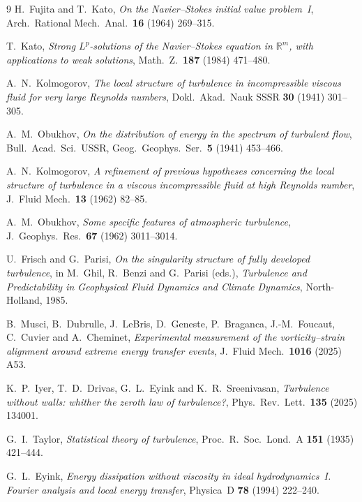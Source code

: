 \documentclass[11pt]{article}
\begin{document}
\begin{thebibliography}{9}
 H.~Fujita and T.~Kato, \emph{On the Navier--Stokes initial value problem~I},
Arch.\ Rational Mech.\ Anal.\ \textbf{16} (1964) 269--315.

 T.~Kato, \emph{Strong $L^p$-solutions of the Navier--Stokes equation in
$\mathbb{R}^m$, with applications to weak solutions}, Math.\ Z.\ \textbf{187} (1984) 471--480.

 A.~N.~Kolmogorov, \emph{The local structure of turbulence in incompressible
viscous fluid for very large Reynolds numbers}, Dokl.\ Akad.\ Nauk SSSR \textbf{30} (1941) 301--305.

 A.~M.~Obukhov, \emph{On the distribution of energy in the spectrum of turbulent
flow}, Bull.\ Acad.\ Sci.\ USSR, Geog.\ Geophys.\ Ser.\ \textbf{5} (1941) 453--466.

 A.~N.~Kolmogorov, \emph{A refinement of previous hypotheses concerning the
local structure of turbulence in a viscous incompressible fluid at high Reynolds number}, J.\ Fluid
Mech.\ \textbf{13} (1962) 82--85.

 A.~M.~Obukhov, \emph{Some specific features of atmospheric turbulence}, J.\
Geophys.\ Res.\ \textbf{67} (1962) 3011--3014.

 U.~Frisch and G.~Parisi, \emph{On the singularity structure of fully developed
turbulence}, in M.~Ghil, R.~Benzi and G.~Parisi (eds.), \emph{Turbulence and Predictability in
Geophysical Fluid Dynamics and Climate Dynamics}, North-Holland, 1985.

 B.~Musci, B.~Dubrulle, J.~LeBris, D.~Geneste, P.~Braganca, J.-M.~Foucaut, C.~Cuvier
and A.~Cheminet, \emph{Experimental measurement of the vorticity--strain alignment around extreme
energy transfer events}, J.\ Fluid Mech.\ \textbf{1016} (2025) A53.

 K.~P.~Iyer, T.~D.~Drivas, G.~L.~Eyink and K.~R.~Sreenivasan, \emph{Turbulence without
walls: whither the zeroth law of turbulence?}, Phys.\ Rev.\ Lett.\ \textbf{135} (2025) 134001.

 G.~I.~Taylor, \emph{Statistical theory of turbulence}, Proc.\ R.\ Soc.\ Lond.\ A
\textbf{151} (1935) 421--444.

 G.~L.~Eyink, \emph{Energy dissipation without viscosity in ideal hydrodynamics~I.
Fourier analysis and local energy transfer}, Physica~D \textbf{78} (1994) 222--240.


\end{thebibliography}
\end{document}
